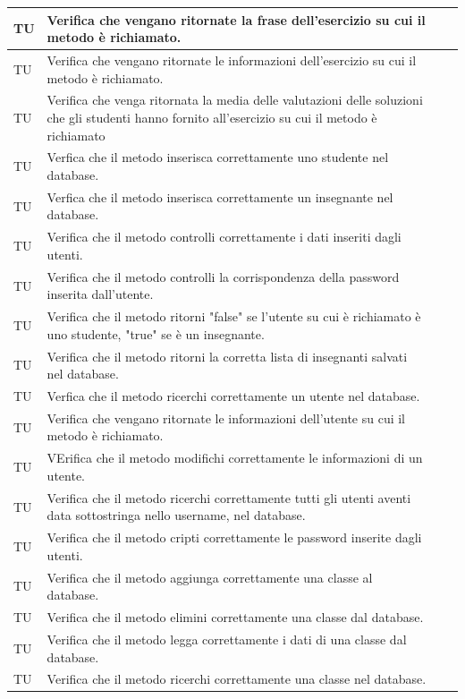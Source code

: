 \begin{longtable}{|>{\centering\arraybackslash}m{1.6cm}|>{\centering\arraybackslash}m{6.41cm}|>{\centering\arraybackslash}m{3.1cm}| c |}
		TU & Verifica che vengano ritornate la frase dell'esercizio su cui il metodo è richiamato.  \\ \hline
		TU & Verifica che vengano ritornate le informazioni dell'esercizio su cui il metodo è richiamato.  \\ \hline
		TU & Verifica che venga ritornata la media delle valutazioni delle soluzioni che gli studenti hanno fornito all'esercizio su cui il metodo è richiamato  \\ \hline
		TU & Verfica che il metodo inserisca correttamente uno studente nel database.  \\ \hline
		TU & Verfica che il metodo inserisca correttamente un insegnante nel database.  \\ \hline
		TU & Verifica che il metodo controlli correttamente i dati inseriti dagli utenti.  \\ \hline
		TU & Verifica che il metodo controlli la corrispondenza della password inserita dall'utente.  \\ \hline
		TU & Verifica che il metodo ritorni "false" se l'utente su cui è richiamato è uno studente, "true" se è un insegnante.  \\ \hline
		TU & Verifica che il metodo ritorni la corretta lista di insegnanti salvati nel database.  \\ \hline
		TU & Verfica che il metodo ricerchi correttamente un utente nel database.  \\ \hline
		TU & Verifica che vengano ritornate le informazioni dell'utente su cui il metodo è richiamato.   \\ \hline
		TU & VErifica che il metodo modifichi correttamente le informazioni di un utente.  \\ \hline
		TU & Verifica che il metodo ricerchi correttamente tutti gli utenti aventi data sottostringa nello username, nel database.  \\ \hline
		TU & Verifica che il metodo cripti correttamente le password inserite dagli utenti.  \\ \hline
		TU & Verifica che il metodo aggiunga correttamente una classe al database. \\ \hline
		TU & Verifica che il metodo elimini correttamente una classe dal database. \\ \hline
		TU & Verifica che il metodo legga correttamente i dati di una classe dal database. \\ \hline
		TU & Verifica che il metodo ricerchi correttamente una classe nel database. \\ \hline

\end{longtable}
